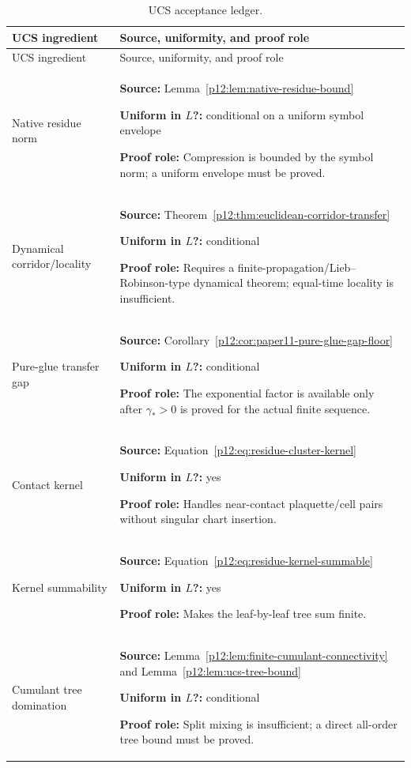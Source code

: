 \documentclass[12pt,a4paper]{article}
\begin{document}
\begin{longtable}{@{}>{\raggedright\arraybackslash}p{} >{\raggedright\arraybackslash}p{}@{}}
\caption[UCS acceptance ledger]{UCS acceptance ledger.}\label{p12:tab:ucs-acceptance-ledger}\\
\toprule
UCS ingredient & Source, uniformity, and proof role \\
\midrule
\endfirsthead
\toprule
UCS ingredient & Source, uniformity, and proof role \\
\midrule
\endhead
Native residue norm & \textbf{Source:} Lemma~\ref{p12:lem:native-residue-bound}\par\textbf{Uniform in $L$?:} conditional on a uniform symbol envelope\par\textbf{Proof role:} Compression is bounded by the symbol norm; a uniform envelope must be proved.  \\
Dynamical corridor/locality & \textbf{Source:} Theorem~\ref{p12:thm:euclidean-corridor-transfer}\par\textbf{Uniform in $L$?:} conditional\par\textbf{Proof role:} Requires a finite-propagation/Lieb--Robinson-type dynamical theorem; equal-time locality is insufficient.  \\
Pure-glue transfer gap & \textbf{Source:} Corollary~\ref{p12:cor:paper11-pure-glue-gap-floor}\par\textbf{Uniform in $L$?:} conditional\par\textbf{Proof role:} The exponential factor is available only after \(\gamma_*>0\) is proved for the actual finite sequence.  \\
Contact kernel & \textbf{Source:} Equation~\eqref{p12:eq:residue-cluster-kernel}\par\textbf{Uniform in $L$?:} yes\par\textbf{Proof role:} Handles near-contact plaquette/cell pairs without singular chart insertion.  \\
Kernel summability & \textbf{Source:} Equation~\eqref{p12:eq:residue-kernel-summable}\par\textbf{Uniform in $L$?:} yes\par\textbf{Proof role:} Makes the leaf-by-leaf tree sum finite.  \\
Cumulant tree domination & \textbf{Source:} Lemma~\ref{p12:lem:finite-cumulant-connectivity} and Lemma~\ref{p12:lem:ucs-tree-bound}\par\textbf{Uniform in $L$?:} conditional\par\textbf{Proof role:} Split mixing is insufficient; a direct all-order tree bound must be proved.  \\

\end{longtable}
\end{document}
